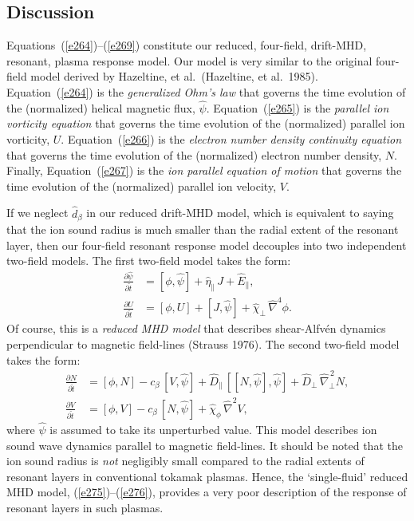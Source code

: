 \documentclass[notitlepage,12pt]{article}
\begin{document}
\subsection{Discussion}
Equations~(\ref{e264})--(\ref{e269}) constitute our reduced, four-field, drift-MHD, resonant, plasma response model. Our model is very similar
to the original four-field model derived by Hazeltine, et al.\ (Hazeltine, et al.\ 1985). Equation~(\ref{e264}) is the {\em generalized
Ohm's law}\/ that governs the time evolution of the (normalized) helical magnetic flux, $\hat{\psi}$. Equation~(\ref{e265}) is the {\em parallel
ion vorticity equation}\/ that governs the  time evolution of the (normalized) parallel ion vorticity, $U$. 
Equation~(\ref{e266}) is the {\em electron number density continuity equation}\/ that 
governs the time evolution of the (normalized) electron number density, $N$. Finally, Equation~(\ref{e267}) is the
{\em ion parallel equation of motion}\/ that governs the time evolution of the  (normalized) parallel ion velocity, $V$. 

If we neglect $\hat{d}_\beta$ in our reduced drift-MHD model, which is equivalent to saying that the ion sound
radius is much smaller than the radial extent of the resonant layer, then our four-field resonant response model
decouples into two independent two-field models. The first two-field model takes the form:
\begin{align}\label{e275}
\frac{\partial\hat{\psi}}{\partial\hat{t}}&= [\phi,\hat{\psi}]+\hat{\eta}_\parallel\,J + \hat{E}_\parallel,\\[0.5ex]
\frac{\partial U}{\partial \hat{t}}&= [\phi,U]  + [J,\hat{\psi}]+\hat{\chi}_\perp  \,\hat{\nabla}^4\phi.\label{e276}
\end{align}
Of course, this is a {\em reduced MHD model}\/ that describes shear-Alfv\'{e}n dynamics perpendicular to
magnetic field-lines (Strauss 1976). The second two-field model takes the form:
\begin{align}
\frac{\partial N}{\partial \hat{t}}&= [\phi,N] -c_\beta\,[V,\hat{\psi}] + \hat{D}_\parallel\,[[N,\hat{\psi}],\hat{\psi}]
+ \hat{D}_\perp\,\hat{\nabla}_\perp^{\,2}N,\\[0.5ex]
\frac{\partial V}{\partial\hat{t}}&= [\phi,V] - c_\beta\,[N,\hat{\psi}] + \hat{\chi}_\phi\,\hat{\nabla}^2 V,
\end{align}
where $\hat{\psi}$ is assumed to take its unperturbed value. 
This model describes ion sound wave dynamics parallel to magnetic field-lines. It should be noted that the
ion sound radius is {\em not}\/ negligibly small compared to the radial extents of resonant layers in conventional 
tokamak plasmas. Hence, the `single-fluid' reduced MHD model, (\ref{e275})--(\ref{e276}), provides  a very poor description
of the response of  resonant layers in such plasmas. 
\end{document}
